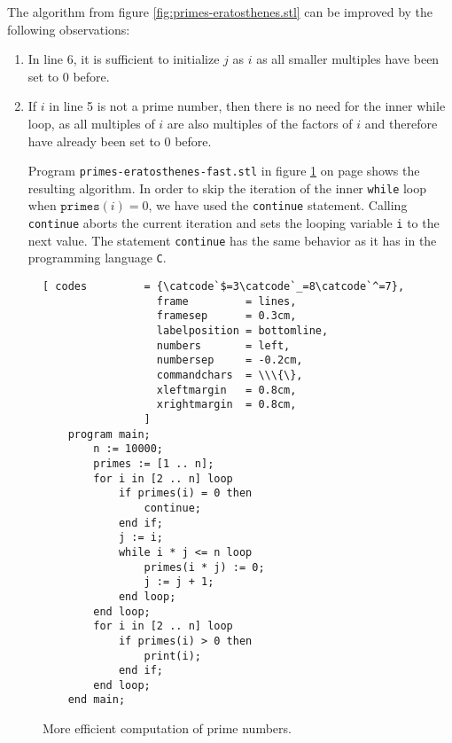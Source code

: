 The algorithm from figure  \ref{fig:primes-eratosthenes.stl} can be improved by the
following observations:
\begin{enumerate}
\item In line 6, it is sufficient to initialize  $j$ as  $i$ as all smaller multiples have been set
      to 0 before.
\item If $i$ in line 5 is not a prime number, then there is no need for the inner while
      loop, as all multiples of $i$ are also multiples of the factors of $i$ and therefore
      have already been set to $0$ before.
  
      Program \texttt{primes-eratosthenes-fast.stl} in figure
      \ref{fig:primes-eratosthenes-fast.stl} on page
      \pageref{fig:primes-eratosthenes-fast.stl} shows the resulting algorithm.
      In order to skip the iteration of the inner  \texttt{while} loop when 
      $\mathtt{primes}(i) = 0$, we have used the \texttt{continue}       statement.
      Calling \texttt{continue} aborts the current iteration and sets the looping variable
       \texttt{i} to the next value.  The statement  \texttt{continue} has the same behavior
       as it has in the programming language \texttt{C}.
\end{enumerate}


\begin{figure}[!ht]
  \centering
\begin{Verbatim}[ codes         = {\catcode`$=3\catcode`_=8\catcode`^=7},
                  frame         = lines, 
                  framesep      = 0.3cm, 
                  labelposition = bottomline,
                  numbers       = left,
                  numbersep     = -0.2cm,
                  commandchars  = \\\{\},
                  xleftmargin   = 0.8cm,
                  xrightmargin  = 0.8cm,
                ]
    program main;
        n := 10000;
        primes := [1 .. n];
        for i in [2 .. n] loop
            if primes(i) = 0 then
                continue;
            end if;
            j := i;
            while i * j <= n loop
                primes(i * j) := 0;
                j := j + 1;
            end loop;
        end loop;
        for i in [2 .. n] loop
            if primes(i) > 0 then
                print(i);
            end if;
        end loop;
    end main;
\end{Verbatim} 
\vspace*{-0.3cm}
\caption{More efficient computation of prime numbers.}  \label{fig:primes-eratosthenes-fast.stl}
\end{figure} %

